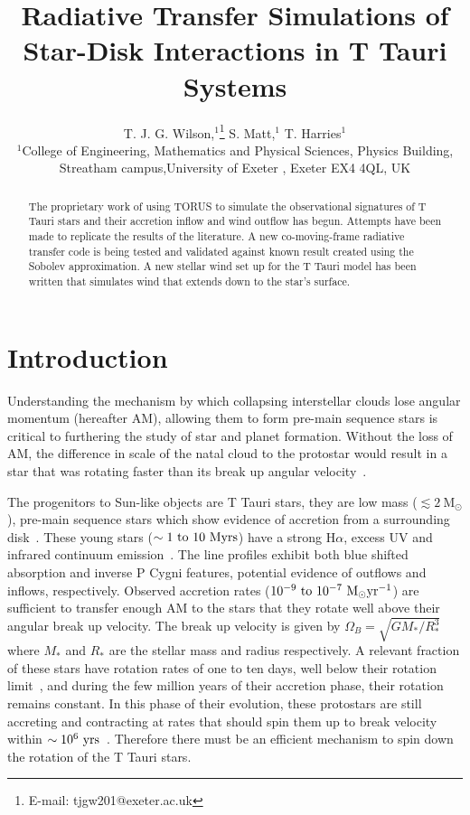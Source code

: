 \documentclass[fleqn,usenatbib]{mnras}
\title[Radiative Transfer of Star-Disk Interactions]{Radiative Transfer Simulations of Star-Disk Interactions in T Tauri Systems}
\author[T. J. G. Wilson et al.]{
T. J. G. Wilson,$^{1}$\thanks{E-mail: tjgw201@exeter.ac.uk}
S. Matt,$^{1}$
T. Harries$^{1}$
\\
$^{1}$College of Engineering, Mathematics and Physical Sciences, Physics Building, Streatham campus,University of Exeter , Exeter EX4 4QL, UK\\
}
\begin{document}
\label{firstpage}
\pagerange{\pageref{firstpage}--\pageref{lastpage}}
\maketitle
\begin{abstract}
\noindent The proprietary work of using TORUS to simulate the observational signatures of T Tauri stars and their accretion inflow and wind outflow has begun. Attempts have been made to replicate the results of the literature. A new co-moving-frame radiative transfer code is being tested and validated against known result created using the Sobolev approximation. A new stellar wind set up for the T Tauri model has been written that simulates wind that extends down to the star's surface.
\end{abstract}



\section{Introduction}
\label{sec:introduction}
Understanding the mechanism by which collapsing interstellar clouds lose angular momentum (hereafter AM), allowing them to form pre-main sequence stars is critical to furthering the study of star and planet formation. Without the loss of AM, the difference in scale of the natal cloud to the protostar would result in a star that was rotating faster than its break up angular velocity~\citep{Hartmann:2016gu}. 


The progenitors to Sun-like objects are T Tauri stars, they are low mass ($\lesssim 2~ \textrm{M}_\odot$), pre-main sequence stars which show evidence of accretion from a surrounding disk~\citep{1998ApJ...495..385H}. These young stars ($\sim 1~{\rm to}~10~\textrm{Myrs}$) have a strong H$\alpha$, excess UV and infrared continuum emission~\citep{2005MNRAS.358..671K}. The line profiles exhibit both blue shifted absorption and inverse P Cygni features, potential evidence of outflows and inflows, respectively. Observed accretion rates ($10^{-9}~\textrm{to}~10^{-7}~{\rm M_{\odot} yr^{-1}}$) are sufficient to transfer enough AM to the stars that they rotate well above their angular break up velocity. The break up velocity is given by $\Omega_B = \sqrt{GM_{*}/R_{*}^3}$~\citep{2005ApJ...632L.135M} where $M_{\ast}$ and $R_{\ast}$ are the stellar mass and radius respectively. A relevant fraction of these stars have rotation rates of one to ten days, well below their rotation limit~\citep{1993A&A...272..176B}, and during the few million years of their accretion phase, their rotation remains constant. In this phase of their evolution, these protostars are still accreting and contracting at rates that should spin them up to break velocity within $\sim10^{6}~{\rm yrs}$~\citep{2009A&A...508.1117Z}. Therefore there must be an efficient mechanism to spin down the rotation of the T Tauri stars. 
\end{document}
